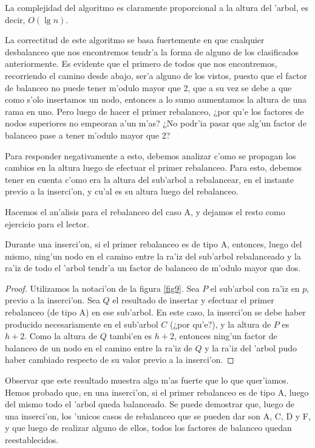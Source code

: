 La complejidad del algoritmo es claramente proporcional a la altura del 'arbol, es decir, $O(\lg n)$.

La correctitud de este algoritmo se basa fuertemente en que cualquier desbalanceo que nos encontremos tendr'a la forma de alguno de los clasificados anteriormente. Es evidente que el primero de todos que nos encontremos, recorriendo el camino desde abajo, ser'a alguno de los vistos, puesto que el factor de balanceo no puede tener m'odulo mayor que 2, que a su vez se debe a que como s'olo insertamos un nodo, entonces a lo sumo aumentamos la altura de una rama en uno. Pero luego de hacer el primer rebalanceo, ¿por qu'e los factores de nodos superiores no empeoran a'un m'as? ¿No podr'ia pasar que alg'un factor de balanceo pase a tener m'odulo mayor que 2?

Para responder negativamente a esto, debemos analizar c'omo se propagan los cambios en la altura luego de efectuar el primer rebalanceo. Para esto, debemos tener en cuenta c'omo era la altura del sub'arbol a rebalancear, en el instante previo a la inserci'on, y cu'al es su altura luego del rebalanceo.

Hacemos el an'alisis para el rebalanceo del caso A, y dejamos el resto como ejercicio para el lector. 

\begin{teo}
Durante una inserci'on, si el primer rebalanceo es de tipo A, entonces, luego del mismo, ning'un nodo en el camino entre la ra'iz del sub'arbol rebalanceado y la ra'iz de todo el 'arbol tendr'a un factor de balanceo de m'odulo mayor que dos.

\begin{proof}
Utilizamos la notaci'on de la figura \ref{fig9}. Sea $P$ el sub'arbol con ra'iz en $p$, previo a la inserci'on. Sea $Q$ el resultado de insertar y efectuar el primer rebalanceo (de tipo A) en ese sub'arbol. En este caso, la inserci'on se debe haber producido necesariamente en el sub'arbol $C$ (¿por qu'e?), y la altura de $P$ es $h + 2$. Como la altura de $Q$ tambi'en es $h + 2$, entonces ning'un factor de balanceo de un nodo en el camino entre la ra'iz de $Q$ y la ra'iz del 'arbol pudo haber cambiado respecto de su valor previo a la inserci'on.
\end{proof}
\end{teo}

Observar que este resultado muestra algo m'as fuerte que lo que quer'iamos. Hemos probado que, en una inserci'on, si el primer rebalanceo es de tipo A, luego del mismo todo el 'arbol queda balanceado. Se puede demostrar que, luego de una inserci'on, los 'unicos casos de rebalanceo que se pueden dar son A, C, D y F, y que luego de realizar alguno de ellos, todos los factores de balanceo quedan reestablecidos.

